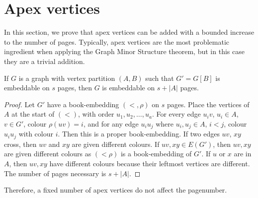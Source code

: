 \section{Apex vertices}
In this section, we prove that apex vertices can be added with a bounded increase to the number of pages. Typically, apex vertices are the most problematic ingredient when applying the Graph Minor Structure theorem, but in this case they are a trivial addition.
\begin{theorem}\label{thm:apex_vertices_pagenumber}
	If \(G\) is a graph with vertex partition \((A, B)\) such that \(G' = G[B]\) is embeddable on $s$ pages, then \(G\) is embeddable on \(s + |A| \) pages.
\end{theorem}
\begin{proof}
	Let \(G'\) have a book-embedding \((<, \rho)\) on $s$ pages. Place the vertices of \(A\) at the start of \((<)\), with order $u_1, u_2, \ldots, u_a$. For every edge \(u_i v \), \(u_i \in A\), \(v \in G'\), colour \(\rho(uv) = i\), and for any edge \(u_i u_j\) where $u_i, u_j \in A$, $i < j$, colour $u_i u_j$ with colour $i$. Then this is a proper book-embedding. If two edges $uv$, $xy$ cross, then $uv$ and $xy$ are given different colours. If $uv, xy \in E(G')$, then $uv, xy$ are given different colours as $(< \rho)$ is a book-embedding of $G'$. If $u$ or $x$ are in $A$, then $uv, xy$ have different colours because their leftmost vertices are different. The number of pages necessary is $s + |A|$. 
\end{proof}

Therefore, a fixed number of apex vertices do not affect the pagenumber.
